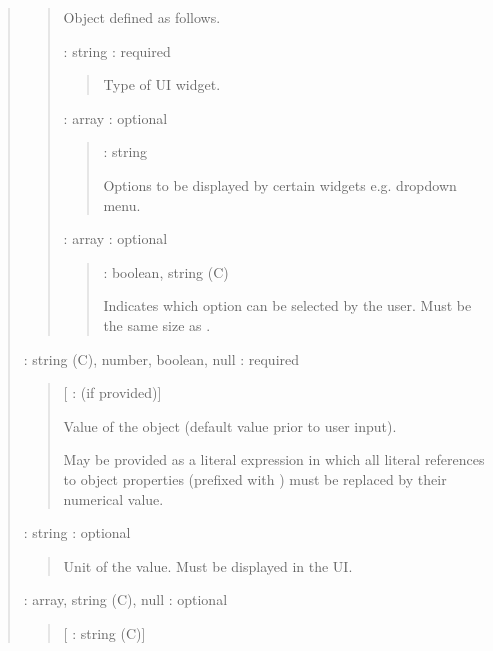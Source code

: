 \documentclass[letterpaper,10pt, openany,english]{sphinxmanual}
\begin{document}
\begin{quote}
\begin{quote}
Object defined as follows.

 : string : required
\begin{quote}

Type of UI widget.
\end{quote}

 : array : optional
\begin{quote}

 : string

Options to be displayed by certain widgets e.g. dropdown menu.
\end{quote}

 : array : optional
\begin{quote}

 : boolean, string (C)

Indicates which option can be selected by the user. Must be the same size as .
\end{quote}
\end{quote}

 : string (C), number, boolean, null : required
\begin{quote}

{[} :  (if provided){]}

\begin{DUlineblock}{0em}
\item[] Value of the object (default value prior to user input).
\item[] May be provided as a literal expression in which all literal references to object properties (prefixed with \sphinxcode{\sphinxupquote{\#}}) must be replaced by their numerical value.
\end{DUlineblock}
\end{quote}

 : string : optional
\begin{quote}

Unit of the value. Must be displayed in the UI.
\end{quote}

 : array, string (C), null : optional
\begin{quote}

{[} : string (C){]}


\end{quote}
\end{quote}
\end{document}
